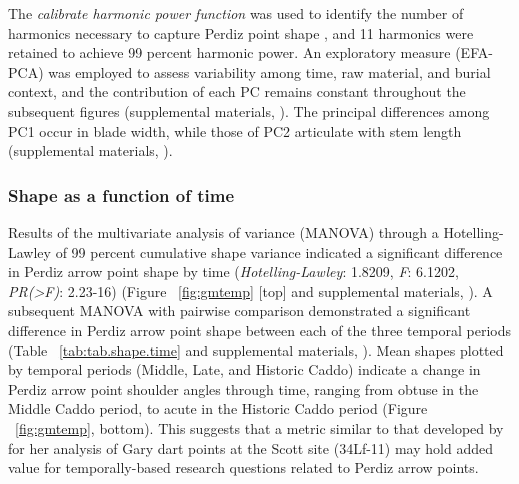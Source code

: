 \documentclass[review]{elsarticle}
\begin{document}
The \textit{calibrate harmonic power function} was used to identify the number of harmonics necessary to capture Perdiz point shape \citep{RN8925}, and 11 harmonics were retained to achieve 99 percent harmonic power. An exploratory measure (EFA-PCA) was employed to assess variability among time, raw material, and burial context, and the contribution of each PC remains constant throughout the subsequent figures  (supplemental materials, \citealt[Chapter 4]{RN8980}). The principal differences among PC1 occur in blade width, while those of PC2 articulate with stem length (supplemental materials, \citealt[Chapter 4]{RN8980}).

\subsubsection*{Shape as a function of time}

Results of the multivariate analysis of variance (MANOVA) through a Hotelling-Lawley of 99 percent cumulative shape variance indicated a significant difference in Perdiz arrow point shape by time (\textit{Hotelling-Lawley}: 1.8209, \textit{F}: 6.1202, \textit{PR(>F)}: 2.23-16) (Figure ~\ref{fig:gmtemp} [top] and supplemental materials, \citealt[Chapter 4]{RN8980}). A subsequent MANOVA with pairwise comparison demonstrated a significant difference in Perdiz arrow point shape between each of the three temporal periods (Table ~\ref{tab:tab.shape.time} and supplemental materials, \citealt[Chapter 4]{RN8980}). Mean shapes plotted by temporal periods (Middle, Late, and Historic Caddo) indicate a change in Perdiz arrow point shoulder angles through time, ranging from obtuse in the Middle Caddo period, to acute in the Historic Caddo period (Figure ~\ref{fig:gmtemp}, bottom). This suggests that a metric similar to that developed by \citet{RN8275} for her analysis of Gary dart points at the Scott site (34Lf-11) may hold added value for temporally-based research questions related to Perdiz arrow points.
\end{document}
